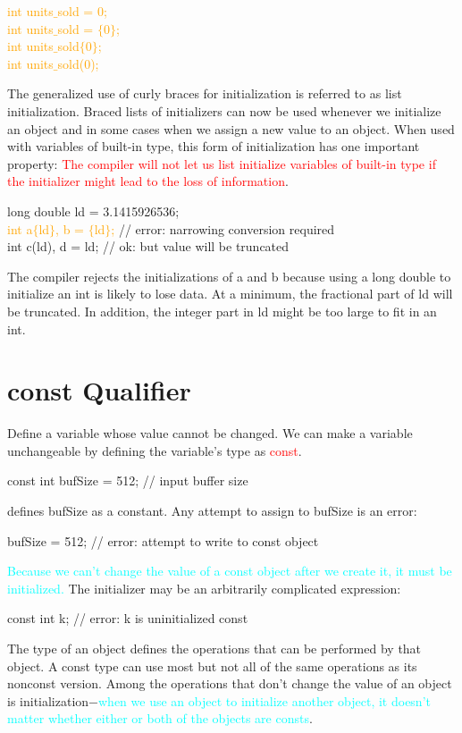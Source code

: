 \documentclass[12pt,a4paper]{article}
\begin{document}
\textcolor{orange}{int units$\_$sold = 0;} \\
\textcolor{orange}{int units$\_$sold = $\{0\}$;} \\
\textcolor{orange}{int units$\_$sold$\{0\}$;} \\
\textcolor{orange}{int units$\_$sold(0);}

The generalized use of curly braces for initialization is referred to as list initialization. Braced lists of initializers can now be used whenever we initialize an object and in some cases when we assign a new value to an object. When used with variables of built-in type, this form of initialization has one important property: \textcolor{red}{The compiler will not let us list initialize variables of built-in type if the initializer might lead to the loss of information}.

long double ld = 3.1415926536; \\
\textcolor{orange}{int a$\{$ld$\}$, b = $\{$ld$\}$;} // error: narrowing conversion required \\
int c(ld), d = ld; // ok: but value will be truncated

The compiler rejects the initializations of a and b because using a long double to initialize an int is likely to lose data. At a minimum, the fractional part of ld will be truncated. In addition, the integer part in ld might be too large to fit in an int.






\section{const Qualifier}
Define a variable whose value cannot be changed. We can make a variable unchangeable by defining the variable’s type as \textcolor{red}{const}.

const int bufSize = 512; // input buffer size

defines bufSize as a constant. Any attempt to assign to bufSize is an error: 

bufSize = 512; // error: attempt to write to const object

\textcolor{cyan}{Because we can’t change the value of a const object after we create it, it must be initialized.} The initializer may be an arbitrarily complicated expression:

const int k; // error: k is uninitialized const

The type of an object defines the operations that can be performed by that object. A const type can use most but not all of the same operations as its nonconst version. Among the operations that don't change the value of an object is initialization$-$\textcolor{cyan}{when we use an object to initialize another object, it doesn’t matter whether either or both of the objects are consts}. 
\end{document}
